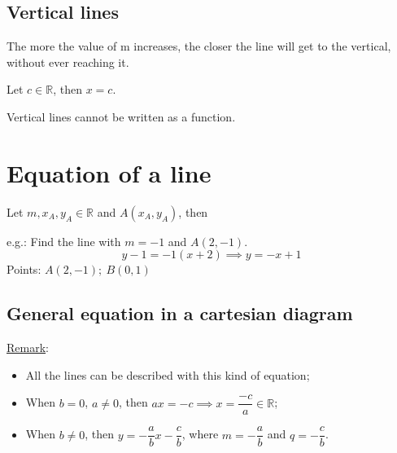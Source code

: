 \documentclass{article}
\newcommand{\figbox}[1]{ 
    \begin{figure*}[ht!]        
        \begin{center}            
            \fbox{#1}        
        \end{center}    
    \end{figure*}
}
\newcommand{\rem}{\underline{Remark}: }
\begin{document}
\subsection{Vertical lines}
The more the value of m increases, the closer the line will get to the vertical,
without ever reaching it.

Let $c \in \mathbb{R}$, then $x=c$.

Vertical lines cannot be written as a function.

\section{Equation of a line}
Let $m,x_A,y_A \in \mathbb{R}$ and $A(x_A, y_A)$, then
\figbox{$y-y_A=m(x-x_A)$}

e.g.: Find the line with $m=-1$ and $A(2,-1)$.
\[
    y-1=-1(x+2) \implies y=-x+1
\]
\hspace{.75cm} Points: $A(2,-1);\ B(0,1)$


\begin{center}
\end{center}

\subsection{General equation in a cartesian diagram}
\figbox{$ax+by+c=0$}

\rem{\begin{itemize}
    \item All the lines can be described with this kind of equation;
    \item When $b=0$, $a \neq 0$, then $ax=-c \implies x=\dfrac{-c}{a} \in \mathbb{R}$;
    \item When $b \neq 0$, then $y=-\dfrac{a}{b}x -\dfrac{c}{b}$,
        where $m=-\dfrac{a}{b}$ and $q=-\dfrac{c}{b}$.
\end{itemize}}
\end{document}
